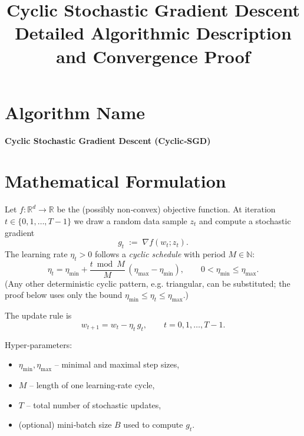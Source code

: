 \documentclass[11pt]{article}
\newcommand{\R}{\mathbb{R}}
\begin{document}
\title{Cyclic Stochastic Gradient Descent \\ Detailed Algorithmic Description and Convergence Proof}
\author{}
\date{}
\maketitle

\section*{Algorithm Name}
\textbf{Cyclic Stochastic Gradient Descent (Cyclic‑SGD)}  

\section*{Mathematical Formulation}
Let $f:\R^{d}\rightarrow\R$ be the (possibly non‑convex) objective function.  
At iteration $t\in\{0,1,\dots,T-1\}$ we draw a random data sample $z_{t}$ and compute a stochastic gradient
\[
g_{t}\;:=\;\nabla f(w_{t};z_{t}) .
\]
The learning rate $\eta_{t}>0$ follows a \emph{cyclic schedule} with period $M\in\mathbb{N}$:
\[
\boxed{\;
\eta_{t}= \eta_{\min} + \frac{t\bmod M}{M}\,(\eta_{\max}-\eta_{\min}),\qquad
0<\eta_{\min}\le \eta_{\max}.
\;}
\]
(Any other deterministic cyclic pattern, e.g. triangular, can be substituted; the proof below uses only the bound
$\eta_{\min}\le\eta_{t}\le\eta_{\max}$.)

The update rule is
\[
\boxed{\; w_{t+1}= w_{t}-\eta_{t}\,g_{t}, \qquad t=0,1,\dots ,T-1 .\;}
\]

Hyper‑parameters:
\begin{itemize}
    \item $\eta_{\min},\eta_{\max}$ – minimal and maximal step sizes,
    \item $M$ – length of one learning‑rate cycle,
    \item $T$ – total number of stochastic updates,
    \item (optional) mini‑batch size $B$ used to compute $g_{t}$.
\end{itemize}

\end{document}
